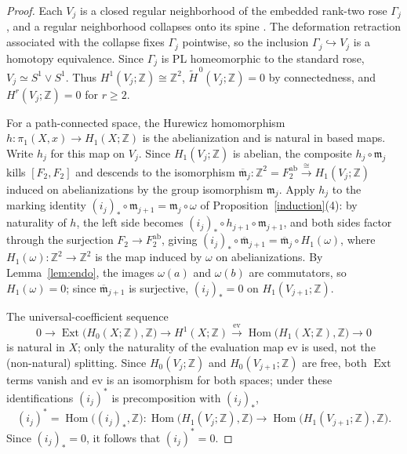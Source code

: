 \documentclass[12pt,oneside,a4paper]{article}
\theoremstyle{mytheorem}
\theoremstyle{remark}
\theoremstyle{definition}
\begin{document}
\begin{proof}
Each $V_j$ is a closed regular neighborhood of the embedded rank-two rose
$\Gamma_j$, and a regular neighborhood collapses onto its spine
\cite[Theorem~3.16]{zbMATH01714503}.  The deformation retraction associated
with the collapse fixes $\Gamma_j$ pointwise, so the inclusion
$\Gamma_j\hookrightarrow V_j$ is a homotopy equivalence.  Since $\Gamma_j$
is PL homeomorphic to the standard rose, $V_j\simeq S^1\vee S^1$.  Thus
$H^1(V_j;\mathbb{Z})\cong\mathbb{Z}^2$,
$\widetilde H^{\,0}(V_j;\mathbb{Z})=0$ by connectedness, and
$H^r(V_j;\mathbb{Z})=0$ for $r\ge2$.

For a path-connected space, the Hurewicz homomorphism
$h:\pi_1(X,x)\to  H_1(X;\mathbb Z)$ is the abelianization and is
natural in based maps.  Write $h_j$ for
this map on $V_j$.  Since $H_1(V_j;\mathbb Z)$ is abelian, the composite
$h_j\circ\mathfrak{m}_j$ kills $[F_2,F_2]$ and descends to the isomorphism
\(\overline{\mathfrak{m}}_j:\mathbb Z^2=F_2^{\mathrm{ab}}
\xrightarrow{\ \cong\ }H_1(V_j;\mathbb Z)\)
induced on abelianizations by the group isomorphism $\mathfrak{m}_j$.  Apply
$h_j$ to the marking identity
$(i_j)_*\circ\mathfrak{m}_{j+1}=\mathfrak{m}_j\circ\omega$ of
Proposition~\ref{induction}(4): by naturality of $h$, the left side becomes
$(i_j)_*\circ h_{j+1}\circ\mathfrak{m}_{j+1}$, and both sides factor through the
surjection $F_2\to F_2^{\mathrm{ab}}$, giving
\((i_j)_*\circ\overline{\mathfrak{m}}_{j+1}=\overline{\mathfrak{m}}_j\circ H_1(\omega)\),
where $H_1(\omega):\mathbb{Z}^2\to\mathbb{Z}^2$ is the map induced by
$\omega$ on abelianizations.  By Lemma~\ref{lem:endo}, the images
$\omega(a)$ and $\omega(b)$ are commutators, so $H_1(\omega)=0$;
since $\overline{\mathfrak{m}}_{j+1}$ is surjective, $(i_j)_*=0$ on
$H_1(V_{j+1};\mathbb{Z})$.

The universal-coefficient sequence
\[
 0\to\operatorname{Ext}\bigl(H_0(X;\mathbb{Z}),\mathbb{Z}\bigr)
 \to H^1(X;\mathbb{Z})
 \xrightarrow{\ \mathrm{ev}\ }
 \operatorname{Hom}\bigl(H_1(X;\mathbb{Z}),\mathbb{Z}\bigr)\to0
\]
is natural in $X$; only the naturality of the
evaluation map $\mathrm{ev}$ is used, not the (non-natural) splitting.
Since $H_0(V_j;\mathbb{Z})$ and $H_0(V_{j+1};\mathbb{Z})$ are free, both
$\operatorname{Ext}$ terms vanish and $\mathrm{ev}$ is an isomorphism for
both spaces; under these identifications $(i_j)^*$ is precomposition with
$(i_j)_*$,
\[
 (i_j)^*=\operatorname{Hom}\bigl((i_j)_*,\mathbb{Z}\bigr):
 \operatorname{Hom}\bigl(H_1(V_j;\mathbb{Z}),\mathbb{Z}\bigr)
 \longrightarrow
 \operatorname{Hom}\bigl(H_1(V_{j+1};\mathbb{Z}),\mathbb{Z}\bigr).
\]
Since $(i_j)_*=0$, it follows that $(i_j)^*=0$.
\end{proof}
\end{document}
